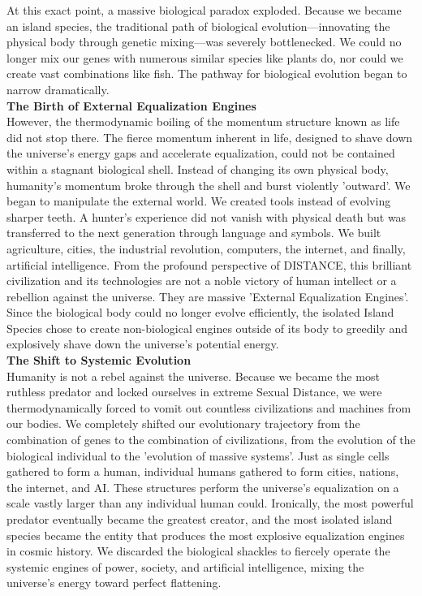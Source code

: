At this exact point, a massive biological paradox exploded. Because we became an island species, the traditional path of biological evolution—innovating the physical body through genetic mixing—was severely bottlenecked. We could no longer mix our genes with numerous similar species like plants do, nor could we create vast combinations like fish. The pathway for biological evolution began to narrow dramatically. \\
\textbf{The Birth of External Equalization Engines} \\
However, the thermodynamic boiling of the momentum structure known as life did not stop there. The fierce momentum inherent in life, designed to shave down the universe's energy gaps and accelerate equalization, could not be contained within a stagnant biological shell. Instead of changing its own physical body, humanity's momentum broke through the shell and burst violently 'outward'.
We began to manipulate the external world. We created tools instead of evolving sharper teeth. A hunter's experience did not vanish with physical death but was transferred to the next generation through language and symbols. We built agriculture, cities, the industrial revolution, computers, the internet, and finally, artificial intelligence.
From the profound perspective of DISTANCE, this brilliant civilization and its technologies are not a noble victory of human intellect or a rebellion against the universe. They are massive 'External Equalization Engines'. Since the biological body could no longer evolve efficiently, the isolated Island Species chose to create non-biological engines outside of its body to greedily and explosively shave down the universe’s potential energy. \\
\textbf{The Shift to Systemic Evolution} \\
Humanity is not a rebel against the universe. Because we became the most ruthless predator and locked ourselves in extreme Sexual Distance, we were thermodynamically forced to vomit out countless civilizations and machines from our bodies. We completely shifted our evolutionary trajectory from the combination of genes to the combination of civilizations, from the evolution of the biological individual to the 'evolution of massive systems'.
Just as single cells gathered to form a human, individual humans gathered to form cities, nations, the internet, and AI. These structures perform the universe's equalization on a scale vastly larger than any individual human could.
Ironically, the most powerful predator eventually became the greatest creator, and the most isolated island species became the entity that produces the most explosive equalization engines in cosmic history. We discarded the biological shackles to fiercely operate the systemic engines of power, society, and artificial intelligence, mixing the universe's energy toward perfect flattening.
